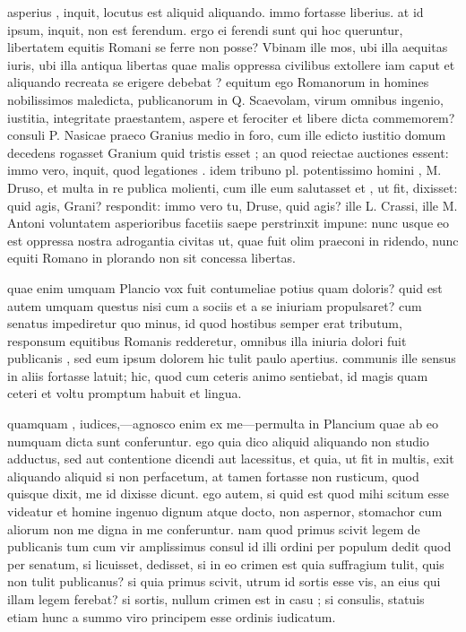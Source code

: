  asperius , inquit, locutus est aliquid aliquando. immo fortasse liberius. at id ipsum, inquit, non est ferendum. ergo ei ferendi sunt qui hoc queruntur, libertatem equitis Romani se ferre non posse? Vbinam ille mos, ubi illa aequitas iuris, ubi illa antiqua libertas quae malis oppressa civilibus extollere iam caput et aliquando recreata se erigere debebat ? equitum ego Romanorum in homines nobilissimos maledicta, publicanorum in Q. Scaevolam, virum omnibus ingenio, iustitia, integritate praestantem, aspere et ferociter et libere dicta commemorem? consuli P. Nasicae praeco Granius medio in foro, cum ille edicto iustitio domum decedens rogasset Granium quid tristis esset ; an quod reiectae auctiones essent: immo vero, inquit, quod legationes . idem tribuno pl. potentissimo homini , M. Druso, et multa in re publica molienti, cum ille eum salutasset et , ut fit, dixisset: quid agis, Grani? respondit: immo vero tu, Druse, quid agis? ille L. Crassi, ille M. Antoni voluntatem asperioribus facetiis saepe perstrinxit impune: nunc usque eo est oppressa nostra adrogantia civitas ut, quae fuit olim praeconi in ridendo, nunc equiti Romano in plorando non sit concessa libertas.

 quae enim umquam Plancio vox fuit contumeliae potius quam doloris? quid est autem umquam questus nisi cum a sociis et a se iniuriam propulsaret? cum senatus impediretur quo minus, id quod hostibus semper erat tributum, responsum equitibus Romanis redderetur, omnibus illa iniuria dolori fuit publicanis , sed eum ipsum dolorem hic tulit paulo apertius. communis ille sensus in aliis fortasse latuit; hic, quod cum ceteris animo sentiebat, id magis quam ceteri et voltu promptum habuit et lingua.

 quamquam , iudices,—agnosco enim ex me—permulta in Plancium quae ab eo numquam dicta sunt conferuntur. ego quia dico aliquid aliquando non studio adductus, sed aut contentione dicendi aut lacessitus, et quia, ut fit in multis, exit aliquando aliquid si non perfacetum, at tamen fortasse non rusticum, quod quisque dixit, me id dixisse dicunt. ego autem, si quid est quod mihi scitum esse videatur et homine ingenuo dignum atque docto, non aspernor, stomachor cum aliorum non me digna in me conferuntur. nam quod primus scivit legem de publicanis tum cum vir amplissimus consul id illi ordini per populum dedit quod per senatum, si licuisset, dedisset, si in eo crimen est quia suffragium tulit, quis non tulit publicanus? si quia primus scivit, utrum id sortis esse vis, an eius qui illam legem ferebat? si sortis, nullum crimen est in casu ; si consulis, statuis etiam hunc a summo viro principem esse ordinis iudicatum.

